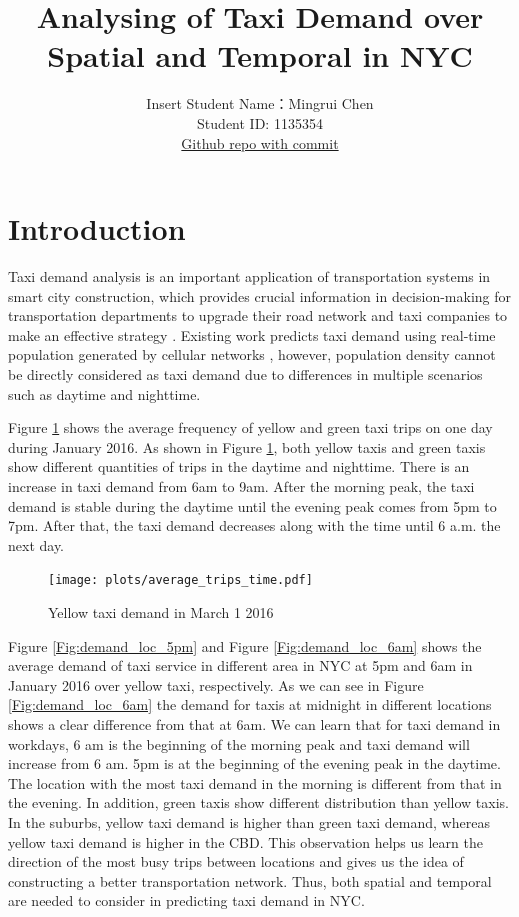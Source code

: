 \documentclass[11pt]{article}
\title{\textbf{Analysing of Taxi Demand over Spatial and Temporal in NYC}}
\author{
Insert Student Name：Mingrui Chen\\
Student ID: 1135354 \\
\href{https://github.com/MAST30034-Applied-Data-Science/mast30034-project-1-Albert-CHEN612.git}{Github repo with commit}
}
\begin{document}
\maketitle

\section{Introduction}
Taxi demand analysis is an important application of transportation systems in smart city construction, which provides crucial information in decision-making for transportation departments to upgrade their road network and taxi companies to make an effective strategy \cite{yao2018deep}.
Existing work predicts taxi demand using real-time population generated by cellular networks \cite{ishiguro2018taxi}, however, population density cannot be directly considered as taxi demand due to differences in multiple scenarios such as daytime and nighttime. 

Figure \ref{Fig:demand_num} shows the average frequency of yellow and green taxi trips on one day during January 2016. As shown in Figure \ref{Fig:demand_num}, both yellow taxis and green taxis show different quantities of trips in the daytime and nighttime. There is an increase in taxi demand from 6am to 9am. After the morning peak, the taxi demand is stable during the daytime until the evening peak comes from 5pm to 7pm. After that, the taxi demand decreases along with the time until 6 a.m. the next day.


\begin{figure}[b]
\texttt{[image: plots/average\_trips\_time.pdf]}
\centering
\caption{Yellow taxi demand in March 1 2016}
\label{Fig:demand_num}
\end{figure}


Figure \ref{Fig:demand_loc_5pm} and Figure \ref{Fig:demand_loc_6am} shows the average demand of taxi service in different area in NYC at 5pm and 6am in January 2016 over yellow taxi, respectively. As we can see in Figure \ref{Fig:demand_loc_6am} the demand for taxis at midnight in different locations shows a clear difference from that at 6am. We can learn that for taxi demand in workdays, 6 am is the beginning of the morning peak and taxi demand will increase from 6 am. 5pm is at the beginning of the evening peak in the daytime. The location with the most taxi demand in the morning is different from that in the evening. In addition, green taxis show different distribution than yellow taxis. In the suburbs, yellow taxi demand is higher than green taxi demand, whereas yellow taxi demand is higher in the CBD. This observation helps us learn the direction of the most busy trips between locations and gives us the idea of constructing a better transportation network. Thus, both spatial and temporal are needed to consider in predicting taxi demand in NYC.
\end{document}
